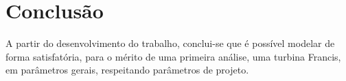 \chapter{Conclusão}\label{chp:Conclusão}

A partir do desenvolvimento do trabalho, conclui-se que é possível modelar de forma satisfatória, para o mérito de uma primeira análise, uma turbina Francis, em parâmetros gerais, respeitando parâmetros de projeto. 